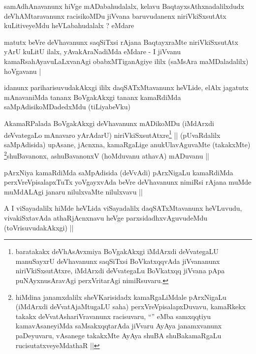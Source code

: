 \begin{artha}
samAdhAnavanunx hiVge mADabahudalalx, kelavu BaqtayxsAthxnadalilxdudx
deVhAMtaravanunx racisikoMDu jiVvana baruvudanenx niriVkiSxsutAtx
kuLitiveyeMdu heVLabahudalalx ? eMdare
\end{artha}


\begin{artha}
matutx beVre deVhavanunx saqSiTxsi rAjana BaqtayxraMte niriVkiSxsutAtx
yArU kuLitU ilalx, yAvakAraNadiMda eMdare - I jiVvanu
kamaRsahAyavuLaLxvanAgi obabxMTiganAgiye ililx (saMsAra maMDaladalilx)
hoVgavanu |
\end{artha}


\begin{artha}
idanunx pariharisuvudakAkxgi ililx daqSATxMtavanunx heVLide, elAlx
jagatutx mAnavaniMda tananx BoVgakAkxgi tananx kamaRdiMda
saMpAdisikoMDadedxMdu (tiLiyabeVku)
\end{artha}

\begin{artha}
AkamaRPalada BoVgakAkxgi deVhavanunx mADikoMDu (iMdArxdi deVvategaLo
mAnavaro yArAdarU) niriVkiSxsutAtxre\footnote[1]{baratakakx
  deVhAsAvxmiya BoVgakAkxgi iMdArxdi deVvategaLU manuSayxrU
  deVhavanunx saqSiTxsi BoVkatxqqvAda jiVvananunx niriVkiSxsutAtxre,
  iMdArxdi deVvategaLu BoVkatxqq jiVvana pApa puNAyxnusAravAgi
  perxVritarAgi nimiRsuvaru.} || (pUvaRdalilx
saMpAdisida) upAsane, jAcnxna, kamaRgaLige anukUlavAguvaMte
(takakxMte) \footnote[2]{hiMdina janamxdalilx sheVKarisidadx
  kamaRgaLiMdale pArxNigaLu (iMdArxdi deVvatAjaMtugaLU saha)
  perxVreVpisalapxDuvavu, kamaRkekx takakx deVvatAshariVravanunx
  racisuvaru, ``\stext'' eMba samxqqtiyu kamavAsaneyiMda
  saMsakxqqtarAda jiVvaru AyAya janamxvanunx paDeyuvaru, vAsanege
  takakxMte AyAya shuBA shuBakamaRgaLu rucisutatxveyeMdathaR ||}shuBavanonx, ashuBavanonxV (hoMduvanu
athavA) mADuvanu ||
\end{artha}

\begin{artha}
pArxNiya kamaRdiMda saMpAdisida (deVvAdi) pArxNigaLu kamaRdiMda
perxVreVpisalapxTuTx yoVgayxvAda beVre deVhavanunx nimiRsi rAjana
muMde muMdALAgi janaru nilulxvaMte nilulxvavu ||
\end{artha}

\begin{artha}
A I viSayadalilx hiMde heVLida viSayadalilx daqSATxMtavanunx
heVLuvudu, vivakiSxtavAda athaRjAcnxnavu heVge parxsidadhxvAguvudeMdu
(toVrisuvudakAkxgi) ||
\end{artha}

